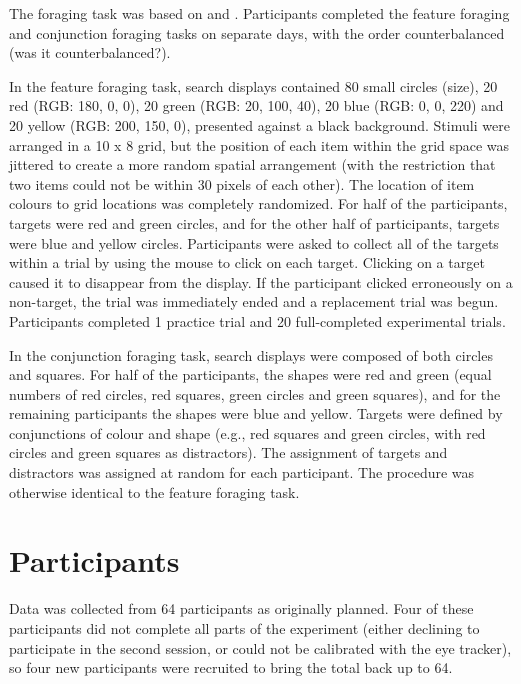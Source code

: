 \documentclass[a4paper, oneside, 11pt, onecolumn]{article}
\begin{document}
The foraging task was based on \cite{kristjansson2014} and \cite{johannesson2016}. Participants completed the feature foraging and conjunction foraging tasks on separate days, with the order counterbalanced (was it counterbalanced?).

In the feature foraging task, search displays contained 80 small circles (size), 20 red (RGB: 180, 0, 0), 20 green (RGB: 20, 100, 40), 20 blue (RGB: 0, 0, 220) and 20 yellow (RGB: 200, 150, 0), presented against a black background. Stimuli were arranged in a 10 x 8 grid, but the position of each item within the grid space was jittered to create a more random spatial arrangement (with the restriction that two items could not be within 30 pixels of each other). The location of item colours to grid locations was completely randomized. 
For half of the participants, targets were red and green circles, and for the other half of participants, targets were blue and yellow circles. Participants were asked to collect all of the targets within a trial by using the mouse to click on each target. Clicking on a target caused it to disappear from the display. If the participant clicked erroneously on a non-target, the trial was immediately ended and a replacement trial was begun. Participants completed 1 practice trial and 20 full-completed experimental trials.

In the conjunction foraging task, search displays were composed of both circles and squares. For half of the participants, the shapes were red and green (equal numbers of red circles, red squares, green circles and green squares), and for the remaining participants the shapes were blue and yellow. Targets were defined by conjunctions of colour and shape (e.g., red squares and green circles, with red circles and green squares as distractors). The assignment of targets and distractors was assigned at random for each participant. The procedure was otherwise identical to the feature foraging task. 


\section{Participants}

Data was collected from 64 participants as originally planned. Four of these participants did not complete all parts of the experiment (either declining to participate in the second session, or could not be calibrated with the eye tracker), so four new participants were recruited to bring the total back up to 64. 
\end{document}

